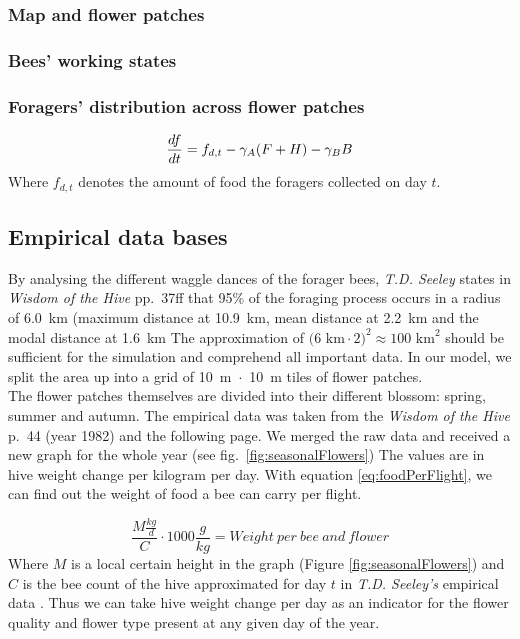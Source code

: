 		\subsubsection{Map and flower patches}
		
		\subsubsection{Bees' working states}
			\label{chap:beeWorkingStates}
			
		
		\subsubsection{Foragers' distribution across flower patches}
		\begin{equation}\label{eq:changeFoodStoreDyn}
			{df \over dt} = f_{d,t}- \gamma_A (F+H) - \gamma_B B
		\end{equation}
		Where $f_{d,t}$ denotes the amount of food the foragers collected on day $t$.
		
	\subsection{Empirical data bases}
		By analysing the different waggle dances of the forager bees, \textit{T.D. Seeley} states in \textit{Wisdom of the Hive} pp.~37ff that 95\% of the foraging process occurs in a radius of 6.0~km (maximum distance at 10.9~km, mean distance at 2.2~km and the modal distance at 1.6~km \cite{seeley95} The approximation of $\text{(6~km}\cdot\text{2)}^2 \approx \text{100~km}^2$ should be sufficient for the simulation and comprehend all important data. In our model, we split the area up into a grid of 10~m~$\cdot$~10~m tiles of flower patches. \\
		The flower patches themselves are divided into their different blossom: spring, summer and autumn. The empirical data was taken from the \textit{Wisdom of the Hive} p.~44 (year 1982) and the following page. We merged the raw data and received a new graph for the whole year (see fig.~\ref{fig:seasonalFlowers}) The values are in hive weight change per kilogram per day. With equation \ref{eq:foodPerFlight}, we can find out the weight of food a bee can carry per flight.
		
		\begin{equation}\label{eq:foodPerFlight}
			\frac{M \frac{kg}{d}}{C}\cdot 1000 \frac{g}{kg} = Weight~per~bee~and~flower
		\end{equation}
		Where $M$ is a local certain height in the graph (Figure \ref{fig:seasonalFlowers}) and $C$ is the bee count of the hive approximated for day $t$ in \textit{T.D. Seeley's} empirical data \cite{seeley95}. Thus we can take hive weight change per day as an indicator for the flower quality and flower type present at any given day of the year. 
		
